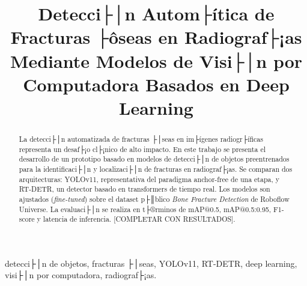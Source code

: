 ﻿\documentclass[conference]{IEEEtran}
\begin{document}
\title{Detecci├│n Autom├ítica de Fracturas ├ôseas en Radiograf├¡as Mediante Modelos de Visi├│n por Computadora Basados en Deep Learning}

\author{
\and
{}
\and
{}
}

\maketitle

\begin{abstract}
La detecci├│n automatizada de fracturas ├│seas en im├ígenes radiogr├íficas representa
un desaf├¡o cl├¡nico de alto impacto. En este trabajo se presenta el desarrollo de un
prototipo basado en modelos de detecci├│n de objetos preentrenados para la
identificaci├│n y localizaci├│n de fracturas en radiograf├¡as.
Se comparan dos arquitecturas: YOLOv11, representativa del paradigma
anchor-free de una etapa, y RT-DETR, un detector basado en transformers de
tiempo real. Los modelos son ajustados (\textit{fine-tuned}) sobre el dataset
p├║blico \textit{Bone Fracture Detection} de Roboflow Universe.
La evaluaci├│n se realiza en t├®rminos de mAP@0.5, mAP@0.5:0.95, F1-score y
latencia de inferencia. [COMPLETAR CON RESULTADOS].
\end{abstract}

\begin{IEEEkeywords}
detecci├│n de objetos, fracturas ├│seas, YOLOv11, RT-DETR, deep learning,
visi├│n por computadora, radiograf├¡as.
\end{IEEEkeywords}

\end{document}
